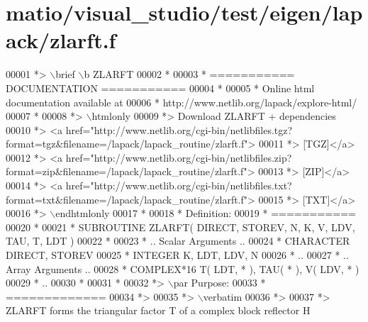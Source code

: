\hypertarget{matio_2visual__studio_2test_2eigen_2lapack_2zlarft_8f_source}{}\section{matio/visual\+\_\+studio/test/eigen/lapack/zlarft.f}
\label{matio_2visual__studio_2test_2eigen_2lapack_2zlarft_8f_source}

\begin{DoxyCode}
00001 \textcolor{comment}{*> \(\backslash\)brief \(\backslash\)b ZLARFT}
00002 \textcolor{comment}{*}
00003 \textcolor{comment}{*  =========== DOCUMENTATION ===========}
00004 \textcolor{comment}{*}
00005 \textcolor{comment}{* Online html documentation available at }
00006 \textcolor{comment}{*            http://www.netlib.org/lapack/explore-html/ }
00007 \textcolor{comment}{*}
00008 \textcolor{comment}{*> \(\backslash\)htmlonly}
00009 \textcolor{comment}{*> Download ZLARFT + dependencies }
00010 \textcolor{comment}{*> <a
       href="http://www.netlib.org/cgi-bin/netlibfiles.tgz?format=tgz&filename=/lapack/lapack\_routine/zlarft.f"> }
00011 \textcolor{comment}{*> [TGZ]</a> }
00012 \textcolor{comment}{*> <a
       href="http://www.netlib.org/cgi-bin/netlibfiles.zip?format=zip&filename=/lapack/lapack\_routine/zlarft.f"> }
00013 \textcolor{comment}{*> [ZIP]</a> }
00014 \textcolor{comment}{*> <a
       href="http://www.netlib.org/cgi-bin/netlibfiles.txt?format=txt&filename=/lapack/lapack\_routine/zlarft.f"> }
00015 \textcolor{comment}{*> [TXT]</a>}
00016 \textcolor{comment}{*> \(\backslash\)endhtmlonly }
00017 \textcolor{comment}{*}
00018 \textcolor{comment}{*  Definition:}
00019 \textcolor{comment}{*  ===========}
00020 \textcolor{comment}{*}
00021 \textcolor{comment}{*       SUBROUTINE ZLARFT( DIRECT, STOREV, N, K, V, LDV, TAU, T, LDT )}
00022 \textcolor{comment}{* }
00023 \textcolor{comment}{*       .. Scalar Arguments ..}
00024 \textcolor{comment}{*       CHARACTER          DIRECT, STOREV}
00025 \textcolor{comment}{*       INTEGER            K, LDT, LDV, N}
00026 \textcolor{comment}{*       ..}
00027 \textcolor{comment}{*       .. Array Arguments ..}
00028 \textcolor{comment}{*       COMPLEX*16         T( LDT, * ), TAU( * ), V( LDV, * )}
00029 \textcolor{comment}{*       ..}
00030 \textcolor{comment}{*  }
00031 \textcolor{comment}{*}
00032 \textcolor{comment}{*> \(\backslash\)par Purpose:}
00033 \textcolor{comment}{*  =============}
00034 \textcolor{comment}{*>}
00035 \textcolor{comment}{*> \(\backslash\)verbatim}
00036 \textcolor{comment}{*>}
00037 \textcolor{comment}{*> ZLARFT forms the triangular factor T of a complex block reflector H}

\end{DoxyCode}
